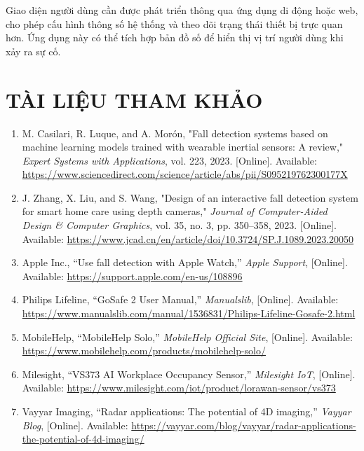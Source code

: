 \documentclass[a4paper,12pt]{report}
\begin{document}
	Giao diện người dùng cần được phát triển thông qua ứng dụng di động hoặc web, cho phép cấu hình thông số hệ thống và theo dõi trạng thái thiết bị trực quan hơn. Ứng dụng này có thể tích hợp bản đồ số để hiển thị vị trí người dùng khi xảy ra sự cố.
	
	\chapter{TÀI LIỆU THAM KHẢO}
	
	\begin{enumerate}
		\item M. Casilari, R. Luque, and A. Morón, "Fall detection systems based on machine learning models trained with wearable inertial sensors: A review," \textit{Expert Systems with Applications}, vol. 223, 2023. [Online]. Available: \url{https://www.sciencedirect.com/science/article/abs/pii/S095219762300177X}
		
		\item J. Zhang, X. Liu, and S. Wang, "Design of an interactive fall detection system for smart home care using depth cameras," \textit{Journal of Computer-Aided Design \& Computer Graphics}, vol. 35, no. 3, pp. 350–358, 2023. [Online]. Available: \url{https://www.jcad.cn/en/article/doi/10.3724/SP.J.1089.2023.20050}
		
		\item Apple Inc., “Use fall detection with Apple Watch,” \textit{Apple Support}, [Online]. Available: \url{https://support.apple.com/en-us/108896}
		
		\item Philips Lifeline, “GoSafe 2 User Manual,” \textit{Manualslib}, [Online]. Available: \url{https://www.manualslib.com/manual/1536831/Philips-Lifeline-Gosafe-2.html}
		
		\item MobileHelp, “MobileHelp Solo,” \textit{MobileHelp Official Site}, [Online]. Available: \url{https://www.mobilehelp.com/products/mobilehelp-solo/}
		
		\item Milesight, “VS373 AI Workplace Occupancy Sensor,” \textit{Milesight IoT}, [Online]. Available: \url{https://www.milesight.com/iot/product/lorawan-sensor/vs373}
		
		\item Vayyar Imaging, “Radar applications: The potential of 4D imaging,” \textit{Vayyar Blog}, [Online]. Available: \url{https://vayyar.com/blog/vayyar/radar-applications-the-potential-of-4d-imaging/}
		

\end{enumerate}
\end{document}
